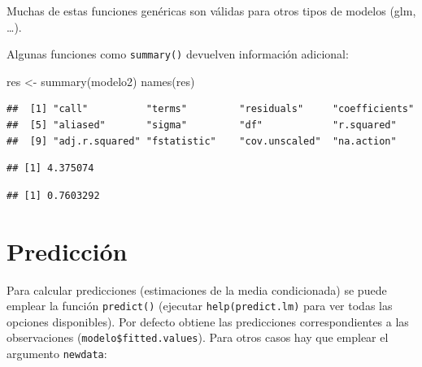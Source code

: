 \documentclass[
]{book}
\newenvironment{Shaded}{\begin{snugshade}}{\end{snugshade}}
\newcommand{\FunctionTok}[1]{\textcolor[rgb]{0.00,0.00,0.00}{#1}}
\newcommand{\NormalTok}[1]{#1}
\newcommand{\OtherTok}[1]{\textcolor[rgb]{0.56,0.35,0.01}{#1}}
\newcommand{\SpecialCharTok}[1]{\textcolor[rgb]{0.00,0.00,0.00}{#1}}
\theoremstyle{break}
\theoremstyle{nonumberplain}
\begin{document}
Muchas de estas funciones genéricas son válidas para otros tipos de
modelos (glm, \ldots).

Algunas funciones como \texttt{summary()} devuelven información adicional:

\begin{Shaded}
\begin{Highlighting}[]
\NormalTok{res }\OtherTok{\textless{}{-}} \FunctionTok{summary}\NormalTok{(modelo2)}
\FunctionTok{names}\NormalTok{(res)}
\end{Highlighting}
\end{Shaded}

\begin{verbatim}
##  [1] "call"          "terms"         "residuals"     "coefficients" 
##  [5] "aliased"       "sigma"         "df"            "r.squared"    
##  [9] "adj.r.squared" "fstatistic"    "cov.unscaled"  "na.action"
\end{verbatim}

\begin{Shaded}
\end{Shaded}

\begin{verbatim}
## [1] 4.375074
\end{verbatim}

\begin{Shaded}
\end{Shaded}

\begin{verbatim}
## [1] 0.7603292
\end{verbatim}

\hypertarget{predicciuxf3n}{%
\section{Predicción}\label{predicciuxf3n}}

Para calcular predicciones (estimaciones de la media condicionada) se puede emplear la función \texttt{predict()} (ejecutar \texttt{help(predict.lm)} para ver todas las opciones disponibles).
Por defecto obtiene las predicciones correspondientes a las observaciones (\texttt{modelo\$fitted.values}). Para otros casos hay que emplear el argumento \texttt{newdata}:
\end{document}
